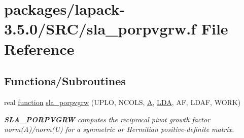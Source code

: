 \hypertarget{sla__porpvgrw_8f}{}\section{packages/lapack-\/3.5.0/\+S\+R\+C/sla\+\_\+porpvgrw.f File Reference}
\label{sla__porpvgrw_8f}
\subsection*{Functions/\+Subroutines}
\begin{DoxyCompactItemize}
\item 
real \hyperlink{afunc_8m_a7b5e596df91eadea6c537c0825e894a7}{function} \hyperlink{group__realPOcomputational_gadcdec581bf34c8535f2813adc33ed631}{sla\+\_\+porpvgrw} (U\+P\+L\+O, N\+C\+O\+L\+S, \hyperlink{classA}{A}, \hyperlink{example__user_8c_ae946da542ce0db94dced19b2ecefd1aa}{L\+D\+A}, A\+F, L\+D\+A\+F, W\+O\+R\+K)
\begin{DoxyCompactList}\small\item\em {\bfseries S\+L\+A\+\_\+\+P\+O\+R\+P\+V\+G\+R\+W} computes the reciprocal pivot growth factor norm(\+A)/norm(U) for a symmetric or Hermitian positive-\/definite matrix. \end{DoxyCompactList}\end{DoxyCompactItemize}
